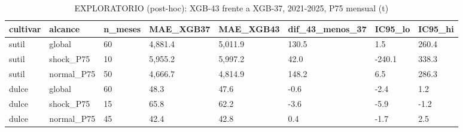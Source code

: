 \begin{table}[H]
\centering
\small
\caption{EXPLORATORIO (post-hoc): XGB-43 frente a XGB-37, 2021-2025, P75 mensual (t)}
\label{tab:T16_exploratorio_xgb43}
\begin{tabular}{llllllll}
\toprule
cultivar & alcance & n\_meses & MAE\_XGB37 & MAE\_XGB43 & dif\_43\_menos\_37 & IC95\_lo & IC95\_hi \\
\midrule
sutil & global & 60 & 4,881.4 & 5,011.9 & 130.5 & 1.5 & 260.4 \\
sutil & shock\_P75 & 10 & 5,955.2 & 5,997.2 & 42.0 & -240.1 & 338.3 \\
sutil & normal\_P75 & 50 & 4,666.7 & 4,814.9 & 148.2 & 6.5 & 286.3 \\
dulce & global & 60 & 48.3 & 47.6 & -0.6 & -2.4 & 1.2 \\
dulce & shock\_P75 & 15 & 65.8 & 62.2 & -3.6 & -5.9 & -1.2 \\
dulce & normal\_P75 & 45 & 42.4 & 42.8 & 0.4 & -1.7 & 2.5 \\
\bottomrule
\end{tabular}
\end{table}